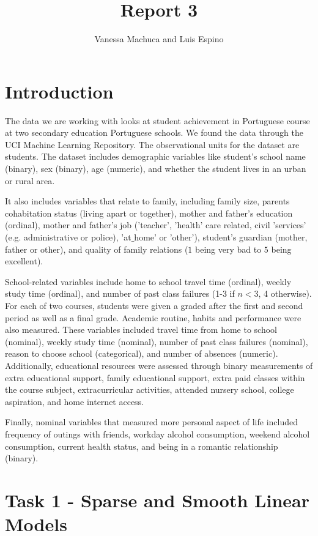 \documentclass{article}
\title{Report 3}
\author{Vanessa Machuca and Luis Espino}
\begin{document}

\maketitle




\section{Introduction} 

The data we are working with looks at student achievement in Portuguese course at two secondary education Portuguese schools. We found the data through the UCI Machine Learning Repository. The observational units for the dataset are students. The dataset includes demographic variables like student’s school name (binary), sex (binary), age (numeric), and whether the student lives in an urban or rural area. 

It also includes variables that relate to family, including family size, parents cohabitation status (living apart or together), mother and father's education (ordinal), mother and father’s job ('teacher', 'health' care related, civil 'services' (e.g. administrative or police), 'at$\_$home' or 'other'), student’s guardian (mother, father or other), and quality of family relations ($1$ being very bad to $5$ being excellent). 

School-related variables include home to school travel time (ordinal), weekly study time (ordinal), and number of past class failures (1-3 if $n<3$, 4 otherwise). For each of two courses, students were given a graded after the first and second period as well as a final grade.  
Academic routine, habits and performance were also measured. These variables included travel time from home to school (nominal), weekly study time (nominal), number of past class failures (nominal), reason to choose school (categorical), and number of absences (numeric). Additionally, educational resources were assessed through binary measurements of extra educational support, family educational support, extra paid classes within the course subject, extracurricular activities, attended nursery school, college aspiration, and home internet access.

Finally, nominal variables that measured more personal aspect of life included frequency of outings with friends, workday alcohol consumption, weekend alcohol consumption, current health status, and being in a romantic relationship (binary). 


\section{Task 1 - Sparse and Smooth Linear Models}
\end{document}
